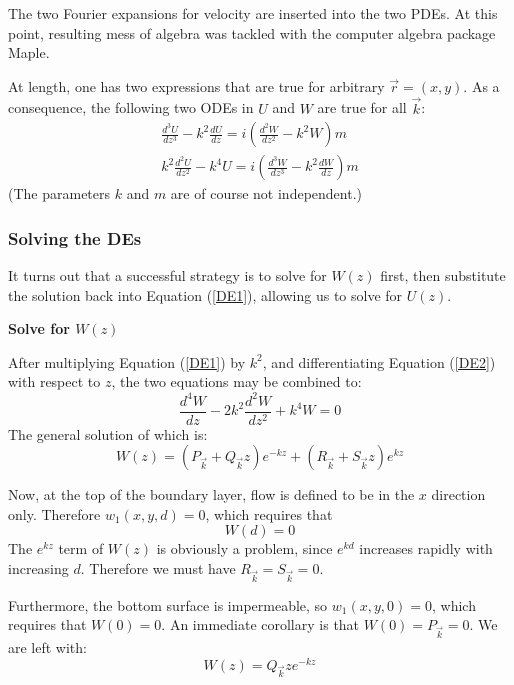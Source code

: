\documentclass[12pt, a4paper, twoside, openright]{book}
\begin{document}
The two Fourier expansions for velocity are inserted into the two PDEs.  At this point, resulting mess of algebra was tackled with the computer algebra package Maple.

At length, one has two expressions that are true for arbitrary $\vec{r} = (x,y)$.  As a consequence, the following two ODEs in $U$ and $W$ are true for all $\vec{k}$:
\begin{gather}
\frac{d^3 U}{dz^3} - k^2 \frac{d U}{dz} = i \left( \frac{d^2 W}{dz^2} - k^2 W \right) m 
\label{DE1} \\
k^2 \frac{d^2 U}{dz^2} - k^4 U = i \left( \frac{d^3 W}{dz^3} - k^2 \frac{dW}{dz} \right) m
\label{DE2}
\end{gather}
(The parameters $k$ and $m$ are of course not independent.)

\subsubsection*{Solving the DEs}

It turns out that a successful strategy is to solve for $W(z)$ first, then substitute the solution back into Equation (\ref{DE1}), allowing us to solve for $U(z)$.

\vspace{1em}
\textbf{Solve for $W(z)$}

After multiplying Equation (\ref{DE1}) by $k^2$, and  differentiating  Equation (\ref{DE2}) with respect to $z$, the two equations may be combined to:
\begin{equation}
\frac{d^4 W}{dz} - 2 k^2 \frac{d^2 W}{dz^2} + k^4 W = 0
\end{equation}
The general solution of which is:
\begin{equation}
W(z) = \left( P_{\vec{k}} + Q_{\vec{k}} z \right) e^{-kz} +
\left( R_{\vec{k}} + S_{\vec{k}} z \right) e^{kz}
\end{equation}

Now, at the top of the boundary layer, flow is defined to be in the $x$ direction only.  Therefore $w_1(x,y,d) = 0$, which requires that
\begin{equation}
W(d) = 0
\end{equation} 
The $e^{kz}$ term of $W(z)$ is obviously a problem, since $e^{kd}$ increases rapidly with increasing $d$.  Therefore we must have $R_{\vec{k}} = S_{\vec{k}} = 0$.

Furthermore, the bottom surface is impermeable, so $w_1(x,y,0) = 0$, which requires that $W(0) = 0$.  An immediate corollary is that $W(0) = P_{\vec{k}} = 0$.
We are left with:
\begin{equation}
W(z) = Q_{\vec{k}} z e^{-kz}
\end{equation} 
\end{document}
